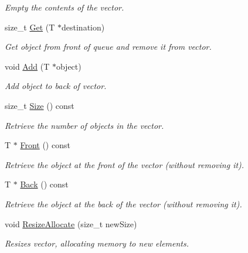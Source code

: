 \begin{DoxyCompactItemize}
\begin{DoxyCompactList}\small\item\em Empty the contents of the vector. \item\end{DoxyCompactList}\item 
size\_\-t \hyperlink{class_store_vector_ad46c0b4759c50a2dfd47c3cbccbb5d67}{Get} (T $\ast$destination)
\begin{DoxyCompactList}\small\item\em Get object from front of queue and remove it from vector. \item\end{DoxyCompactList}\item 
void \hyperlink{class_store_vector_a2c946161d0ec3f96aa023bd8d22bc5af}{Add} (T $\ast$object)
\begin{DoxyCompactList}\small\item\em Add object to back of vector. \item\end{DoxyCompactList}\item 
size\_\-t \hyperlink{class_store_vector_a161dc8c23affc6290c7dced3f1b77382}{Size} () const 
\begin{DoxyCompactList}\small\item\em Retrieve the number of objects in the vector. \item\end{DoxyCompactList}\item 
T $\ast$ \hyperlink{class_store_vector_a7011731300d7ec28cfde632a9d6eff56}{Front} () const 
\begin{DoxyCompactList}\small\item\em Retrieve the object at the front of the vector (without removing it). \item\end{DoxyCompactList}\item 
T $\ast$ \hyperlink{class_store_vector_ac858192f1e1e1e4bdfe6f3167f9cd204}{Back} () const 
\begin{DoxyCompactList}\small\item\em Retrieve the object at the back of the vector (without removing it). \item\end{DoxyCompactList}\item 
void \hyperlink{class_store_vector_a1543ced25b1b5f154462d3f274434bad}{ResizeAllocate} (size\_\-t newSize)
\begin{DoxyCompactList}\small\item\em Resizes vector, allocating memory to new elements. \item\end{DoxyCompactList}\item 

\end{DoxyCompactItemize}
